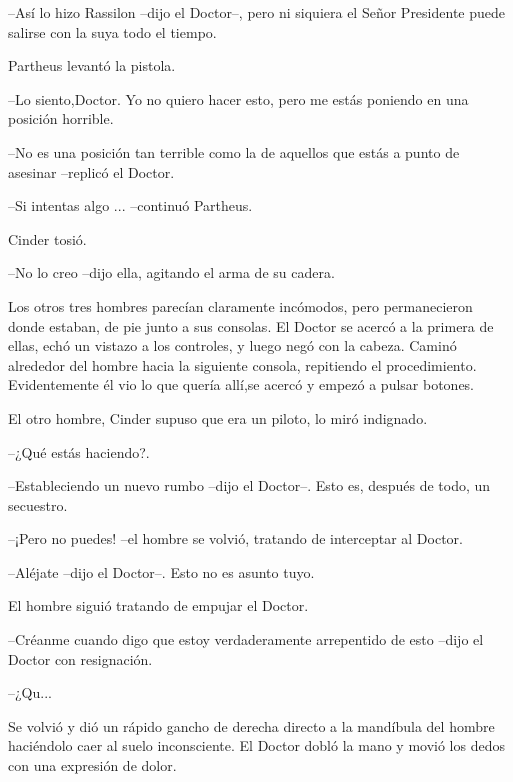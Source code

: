 --Así lo hizo Rassilon --dijo el Doctor--, pero ni siquiera el Señor Presidente puede salirse con la suya todo el tiempo.



Partheus levantó la pistola. 



--Lo siento,Doctor. Yo no quiero hacer esto, pero me estás poniendo en una posición horrible.

--No es una posición tan terrible como la de aquellos que estás a punto de asesinar --replicó el Doctor.

--Si intentas algo ... --continuó Partheus.



Cinder tosió. 



--No lo creo --dijo ella, agitando el arma de su cadera.



Los otros tres hombres parecían claramente incómodos, pero permanecieron donde estaban, de pie junto a sus consolas. El Doctor se acercó a la primera de ellas, echó un vistazo a los controles, y luego negó con la cabeza. Caminó alrededor del hombre hacia la siguiente consola, repitiendo el procedimiento. Evidentemente él vio lo que quería allí,se acercó y empezó a pulsar botones.

El otro hombre, Cinder supuso que era un piloto, lo miró indignado. 



--¿Qué estás haciendo?.

--Estableciendo un nuevo rumbo --dijo el Doctor--. Esto es, después de todo, un secuestro.

--¡Pero no puedes! --el hombre se volvió, tratando de interceptar al Doctor.

--Aléjate --dijo el Doctor--. Esto no es asunto tuyo.



El hombre siguió tratando de empujar el Doctor.



--Créanme cuando digo que estoy verdaderamente arrepentido de esto --dijo el Doctor con resignación.

--¿Qu...



Se volvió y dió un rápido gancho de derecha directo a la mandíbula del hombre haciéndolo caer al suelo inconsciente. El Doctor dobló la mano y movió los dedos con una expresión de dolor. 



